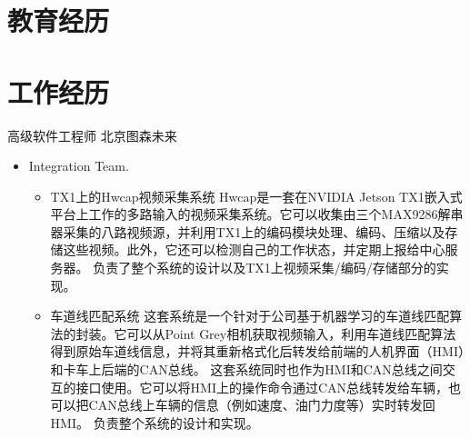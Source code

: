 \documentclass[10pt,a4paper,roman]{moderncv} %
\begin{document}
\makecvtitle

\vspace{-1cm}

\section{教育经历}

\section{工作经历}
        {高级软件工程师}
        {}
        {北京图森未来}
        {}
        {\begin{itemize}%
         \item Integration Team.
               \begin{itemize}%
               \item TX1上的Hwcap视频采集系统\newline{}%
                     Hwcap是一套在NVIDIA Jetson TX1嵌入式平台上工作的多路输入的视频采集系统。它可以收集由三个MAX9286解串器\footnotemark[1]{}采集的八路视频源，并利用TX1上的编码模块处理、编码、压缩以及存储这些视频。此外，它还可以检测自己的工作状态，并定期上报给中心服务器。\newline{}%
                     负责了整个系统的设计以及TX1上视频采集/编码/存储部分的实现。
               \item 车道线匹配系统\newline{}%
                     这套系统是一个针对于公司基于机器学习的车道线匹配算法的封装。它可以从Point Grey相机获取视频输入，利用车道线匹配算法得到原始车道线信息，并将其重新格式化后转发给前端的人机界面（HMI）和卡车上后端的CAN总线。\newline{}%
                     这套系统同时也作为HMI和CAN总线之间交互的接口使用。它可以将HMI上的操作命令通过CAN总线转发给车辆，也可以把CAN总线上车辆的信息（例如速度、油门力度等）实时转发回HMI。\newline{}%
                     负责整个系统的设计和实现。
               \end{itemize}
         \end{itemize}}
\end{document}
